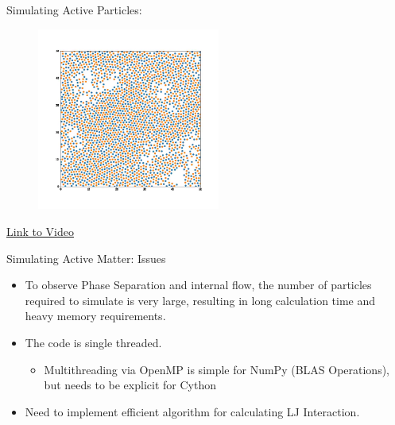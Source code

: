 \documentclass[10pt]{beamer}
\begin{document}
\begin{frame}[label={sec:orgb54d356}]{Simulating Active Particles:}
\begin{figure}[htbp]
\centering
\includegraphics[width=6cm]{./Active3.png}
\end{figure}

\href{./Active3.mp4}{Link to Video}
\end{frame}


\begin{frame}[label={sec:org71fcd63}]{Simulating Active Matter: Issues}
\begin{itemize}
\item To observe Phase Separation and internal flow, the number of particles required to simulate is very large, resulting in long calculation time and heavy memory requirements.
\item The code is single threaded.
\begin{itemize}
\item Multithreading via OpenMP is simple for NumPy (BLAS Operations), but needs to be explicit for Cython
\end{itemize}
\item Need to implement efficient algorithm for calculating LJ Interaction.
\end{itemize}
\end{frame}
\end{document}
